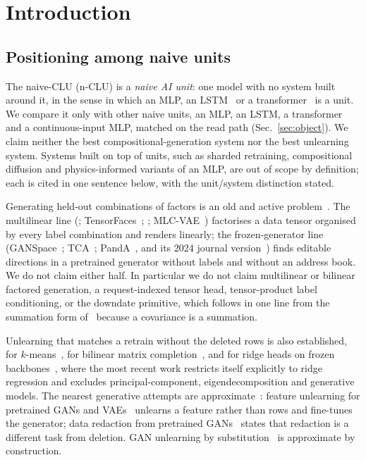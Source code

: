 \documentclass{article} %
\begin{document}
\section{Introduction}
\label{sec:intro}

\subsection{Positioning among naive units}
\label{sec:positioning}

The naive-CLU (n-CLU) is a \emph{naive AI unit}: one model with no system built around it, in the sense
in which an MLP, an LSTM~\citep{hochreiter_long_1997} or a transformer~\citep{vaswani_attention_2023} is a unit. We compare it only with other naive units, an
MLP, an LSTM, a transformer and a continuous-input MLP, matched on the read path
(Sec.~\ref{sec:object}). We claim neither the best compositional-generation system nor the best
unlearning system. Systems built on top of units, such as sharded retraining, compositional
diffusion and physics-informed variants of an MLP, are out of scope by definition; each is cited
in one sentence below, with the unit/system distinction stated.

Generating held-out combinations of factors is an old and active problem~\citep{du_compositional_2020,avidan_compositional_2022}. The multilinear
line (\citealp{tenenbaum_separating_2000};
TensorFaces~\citep{goos_multilinear_2002}; \citealp{vlasic_face_2005}; MLC-VAE~\citep{georgopoulos_multilinear_2020}) factorises a data tensor organised by every label combination and
renders linearly; the frozen-generator line (GANSpace~\citep{harkonen_ganspace_2020}; TCA~\citep{oldfield_tensor_2021}; PandA~\citep{oldfield_panda_2023}, and its
2024 journal version~\citep{oldfield_bilinear_2024}) finds editable directions in a pretrained generator without labels and
without an address book. We do not claim either half. In particular we do not claim
multilinear or bilinear factored generation, a request-indexed tensor head, tensor-product
label conditioning, or the downdate primitive, which follows in one line from the summation
form of~\citet{cao_towards_2015} because a covariance is a summation.

Unlearning that matches a retrain without the deleted rows is also established, for $k$-means~\citep{ginart_making_2019}, for bilinear
matrix completion~\citep{xu_netflix_2023}, and for ridge heads on frozen backbones~\citep{ceci_exact_2027}, where the most recent work
restricts itself explicitly to ridge regression and excludes principal-component,
eigendecomposition and generative models. The nearest generative attempts are approximate~\citep{kong_approximate_2022}:
feature unlearning for pretrained GANs and VAEs~\citep{moon_feature_2024} unlearns a feature rather than rows and
fine-tunes the generator; data redaction from pretrained GANs~\citep{kong_data_2023} states that redaction is a
different task from deletion. GAN unlearning by substitution~\citep{sun_generative_2025} is approximate by construction.
\end{document}
